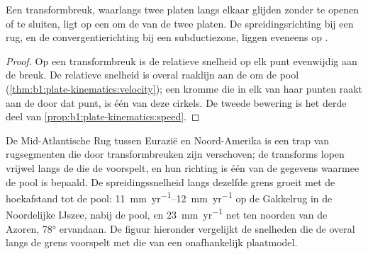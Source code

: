 \begin{proposition}\label{prop:b1:plate-kinematics:transforms}
Een transformbreuk, waarlangs twee platen langs elkaar glijden zonder te openen of te sluiten, ligt op een  om de  van de twee platen. De spreidingsrichting bij een rug, en de convergentierichting bij een subductiezone, liggen eveneens op .
\end{proposition}

\begin{proof}
Op een transformbreuk is de relatieve snelheid op elk punt evenwijdig aan de breuk. De relatieve snelheid is overal raaklijn aan de  om de pool (\cref{thm:b1:plate-kinematics:velocity}); een kromme die in elk van haar punten raakt aan de  door dat punt, is één van deze cirkels. De tweede bewering is het derde deel van \cref{prop:b1:plate-kinematics:speed}.
\end{proof}

De Mid-Atlantische Rug tussen Eurazië en Noord-Amerika is een trap van rugsegmenten die door transformbreuken zijn verschoven; de transforms lopen vrijwel langs de  die de  voorspelt, en hun richting is één van de gegevens waarmee de pool is bepaald. De spreidingssnelheid langs dezelfde grens groeit met de hoekafstand tot de pool: \qtyrange{11}{12}{mm.yr^{-1}} op de Gakkelrug in de Noordelijke IJszee, nabij de pool, en \qty{23}{mm.yr^{-1}} net ten noorden van de Azoren, \ang{78} ervandaan. De figuur hieronder vergelijkt de snelheden die de  overal langs de grens voorspelt met die van een onafhankelijk plaatmodel.

